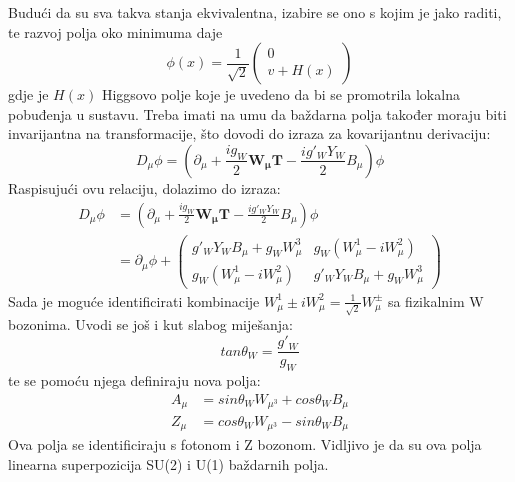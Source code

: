 \documentclass[a4paper,12pt]{report}
\begin{document}
Budući da su sva takva stanja ekvivalentna, izabire se ono s kojim je jako raditi, te razvoj polja oko minimuma daje 
\begin{equation}
 \phi(x)=\frac{1}{\sqrt{2}}\left(\begin{array}{c}0\\ v+H(x)\end{array}\right)
\label{equ:phi}
\end{equation}
gdje je $H(x)$ Higgsovo polje koje je uvedeno da bi se promotrila lokalna pobuđenja u sustavu. Treba imati na umu da baždarna polja također moraju biti invarijantna na transformacije, što dovodi do izraza za kovarijantnu derivaciju:
\begin{equation}
 D_{\mu}\phi=\left( \partial_{\mu}+\frac{i g_W}{2} \mathbf{W_{\mu}T}-\frac{i g'_W Y_W}{2}B_{\mu} \right) \phi
\end{equation}
Raspisujući ovu relaciju, dolazimo do izraza:
\begin{align}
 D_{\mu}\phi&=\left( \partial_{\mu}+\frac{i g_W}{2} \mathbf{W_{\mu}T}-\frac{i g'_W Y_W}{2}B_{\mu} \right) \phi \nonumber \\  &= \partial_{\mu}\phi + \begin{pmatrix} g'_W Y_W B_{\mu}+g_W W^3_{\mu} & g_W(W_{\mu}^1-iW_{\mu}^2) \\  g_W(W_{\mu}^1-iW_{\mu}^2) &  g'_W Y_W B_{\mu}+g_W W^3_{\mu} \end{pmatrix}
\label{equ:higgsderivacija}
\end{align}
Sada je moguće identificirati kombinacije $W_{\mu}^1 \pm iW_{\mu}^2 = \frac{1}{\sqrt{2}} W_{\mu}^{\pm} $ sa fizikalnim W bozonima. Uvodi se još i kut slabog miješanja:
\begin{equation}
 tan \theta_W = \frac{g'_W}{g_W}
\label{equ:kutmijesanja}
\end{equation}
te se pomoću njega definiraju nova polja:
\begin{align}
 A_{\mu} &= sin\theta_W W_{\mu ^3} + cos \theta_W B_{\mu} 
\label{equ:higgslinkomb1} \\
 Z_{\mu} &= cos\theta_W W_{\mu ^3} - sin \theta_W B_{\mu}
\label{equ:higgslinkomb2}
\end{align}
Ova polja se identificiraju s fotonom i Z bozonom. Vidljivo je da su ova polja linearna superpozicija SU(2) i U(1) baždarnih polja. 
\end{document}
